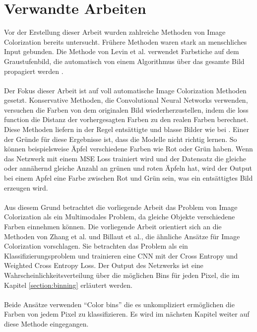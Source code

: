 \section{Verwandte Arbeiten}\label{subsection:verwandte-arbeiten}
Vor der Erstellung dieser Arbeit wurden zahlreiche Methoden von Image Colorization bereits untersucht. Frühere Methoden waren stark an menschliches Input
gebunden. Die Methode von Levin et al. verwendet Farbstiche auf dem Graustufenbild, die automatisch von einem Algorithmus über das gesamte 
Bild propagiert werden \cite{10.1145/1015706.1015780}.
\\
\\
Der Fokus dieser Arbeit ist auf voll automatische Image Colorization Methoden gesetzt. Konservative Methoden, die Convolutional Neural Networks 
verwenden, versuchen die Farben von dem originalen Bild wiederherzustellen, indem die \gls{loss function} die Distanz der vorhergesagten
Farben zu den realen Farben berechnet. Diese Methoden liefern in der Regel entsättigte und blasse Bilder wie bei \cite{zbulak2019image}. 
Einer der Gründe für diese Ergebnisse ist, dass die Modelle nicht richtig lernen. So können beispielsweise Äpfel verschiedene Farben 
wie Rot oder Grün haben. Wenn das Netzwerk mit einem MSE Loss trainiert wird und der Datensatz die gleiche oder annähernd gleiche Anzahl an
grünen und roten Äpfeln hat, wird der Output bei einem Apfel eine Farbe zwischen Rot und Grün sein, was ein entsättigtes Bild erzeugen wird.
\\
\\
Aus diesem Grund betrachtet die vorliegende Arbeit das Problem von Image Colorization als ein Multimodales Problem, 
da gleiche Objekte verschiedene Farben einnehmen können.
Die vorliegende Arbeit orientiert sich an die Methoden von Zhang et al. und Billaut et al., die ähnliche Ansätze für Image Colorization vorschlagen.
Sie betrachten das Problem als ein Klassifizierungsproblem und trainieren eine CNN mit der Cross Entropy und Weighted Cross Entropy Loss. 
Der Output des Netzwerks ist eine Wahrscheinlichkeitsverteilung über die möglichen Bins für jeden Pixel, die im Kapitel \ref{section:binning} erläutert werden.
\\
\\
Beide Ansätze verwenden ``Color \gls{bin}s'' die es unkompliziert ermöglichen die Farben von jedem Pixel zu klassifizieren. 
Es wird im nächsten Kapitel weiter auf diese Methode eingegangen.
